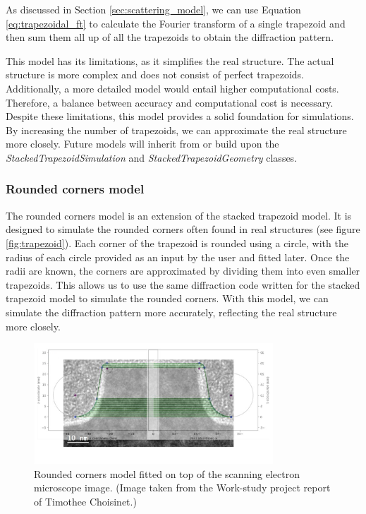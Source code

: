 \medskip

As discussed in Section \ref{sec:scattering_model}, we can use Equation \ref{eq:trapezoidal_ft} 
to calculate the Fourier transform of a single trapezoid and then sum them all up of 
all the trapezoids to obtain the diffraction pattern.

\medskip

This model has its limitations, as it simplifies the real structure. The actual structure is more 
complex and does not consist of perfect trapezoids. Additionally, a more detailed model would 
entail higher computational costs. Therefore, a balance between accuracy and computational cost 
is necessary. Despite these limitations, this model provides a solid foundation for simulations. 
By increasing the number of trapezoids, we can approximate the real structure more closely. Future
models will inherit from or build upon the \textit{StackedTrapezoidSimulation} and 
\textit{StackedTrapezoidGeometry} classes.

\medskip

\subsubsection{Rounded corners model}

The rounded corners model is an extension of the stacked trapezoid model. It is designed to 
simulate the rounded corners often found in real structures (see figure \ref{fig:trapezoid}). 
Each corner of the trapezoid is rounded using a circle, with the radius of each circle provided 
as an input by the user and fitted later. Once the radii are known, the corners are approximated 
by dividing them into even smaller trapezoids. This allows us to use the same diffraction code written for the
stacked trapezoid model to simulate the rounded corners. With this model, we can simulate the 
diffraction pattern more accurately, reflecting the real structure more closely.

\begin{figure}[h]
    \centering
    \includegraphics[width=0.8\textwidth]{images/rounded.PNG}
    \caption{Rounded corners model fitted on top of the scanning electron microscope image. (Image taken from the Work-study project report of Timothee Choisinet.) }
    \label{fig:rounded_corners}
\end{figure}

